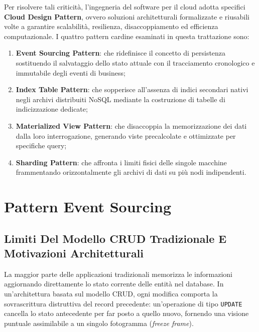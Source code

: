 \documentclass[11pt, a4paper]{article}
\begin{document}
Per risolvere tali criticità, l'ingegneria del software per il cloud adotta specifici \textbf{Cloud Design Pattern}, ovvero soluzioni architetturali formalizzate e riusabili volte a garantire scalabilità, resilienza, disaccoppiamento ed efficienza computazionale. I quattro pattern cardine esaminati in questa trattazione sono:
\begin{enumerate}[noitemsep]
    \item \textbf{Event Sourcing Pattern}: che ridefinisce il concetto di persistenza sostituendo il salvataggio dello stato attuale con il tracciamento cronologico e immutabile degli eventi di business;
    \item \textbf{Index Table Pattern}: che sopperisce all'assenza di indici secondari nativi negli archivi distribuiti NoSQL mediante la costruzione di tabelle di indicizzazione dedicate;
    \item \textbf{Materialized View Pattern}: che disaccoppia la memorizzazione dei dati dalla loro interrogazione, generando viste precalcolate e ottimizzate per specifiche query;
    \item \textbf{Sharding Pattern}: che affronta i limiti fisici delle singole macchine frammentando orizzontalmente gli archivi di dati su più nodi indipendenti.
\end{enumerate}

\newpage


\section{Pattern Event Sourcing}

\subsection{Limiti Del Modello CRUD Tradizionale E Motivazioni Architetturali}

La maggior parte delle applicazioni tradizionali memorizza le informazioni aggiornando direttamente lo stato corrente delle entità nel database. In un'architettura basata sul modello CRUD, ogni modifica comporta la sovrascrittura distruttiva del record precedente: un'operazione di tipo \texttt{UPDATE} cancella lo stato antecedente per far posto a quello nuovo, fornendo una visione puntuale assimilabile a un singolo fotogramma (\emph{freeze frame}).
\end{document}
